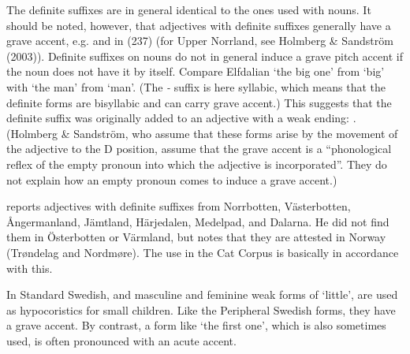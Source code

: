 {%
The definite suffixes are in general identical to the ones used with nouns. It should be noted, however, that adjectives with definite suffixes generally have a grave accent, e.g.  and  in (237) (for Upper Norrland, see Holmberg \& Sandström (2003)). Definite suffixes on nouns do not in general induce a grave pitch accent if the noun does not have it by itself. Compare Elfdalian  ‘the big one’ from  ‘big’ with  ‘the man’ from  ‘man’. (The\textit{ {}-} suffix is here syllabic, which means that the definite forms are bisyllabic and can carry grave accent.) This suggests that the definite suffix was originally added to an adjective with a weak ending: . (Holmberg \& Sandström, who assume that these forms arise by the movement of the adjective to the D position, assume that the grave accent is a “phonological reflex of the empty pronoun into which the adjective is incorporated”. They do not explain how an empty pronoun comes to induce a grave accent.) 


\citet[51]{Delsing2003a} reports adjectives with definite suffixes from Norrbotten, Västerbotten, Ångermanland, Jämtland, Härjedalen, Medelpad, and Dalarna. He did not find them in Österbotten or Värmland, but notes that they are attested in Norway (Trøndelag and Nordmøre). The use in the Cat Corpus is basically in accordance with this. 


In Standard Swedish,  and  masculine and feminine weak forms of  ‘little’, are used as hypocoristics for small children. Like the Peripheral Swedish forms, they have a grave accent. By contrast, a form like  ‘the first one’, which is also sometimes used, is often pronounced with an acute accent. 


}
